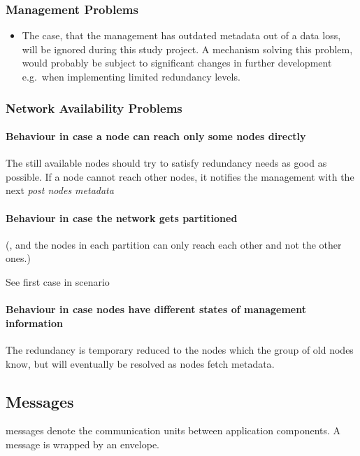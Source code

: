\subsubsection{Management Problems}\label{sec:scenario-management-problems}
\begin{itemize}
    \item The case, that the \gls{management} has outdated \gls{metadata} out of a data loss, will be ignored during this study project. A mechanism solving this problem, would probably be subject to significant changes in further development e.g.\ when implementing limited redundancy levels. %
\end{itemize}

\subsubsection{Network Availability Problems}\label{sec:scenario-network-errors}
\paragraph{Behaviour in case a node can reach only some nodes directly}
The still available \glspl{node} should try to satisfy redundancy needs as good as possible.
If a \gls{node} cannot reach other \glspl{node}, it notifies the \gls{management} with the next \emph{post nodes metadata}

\paragraph{Behaviour in case the network gets partitioned}
(, and the \glspl{node} in each partition can only reach each other and not the other ones.)

See first case in scenario~

\paragraph{Behaviour in case nodes have different states of management information}
The redundancy is temporary reduced to the \glspl{node} which the group of old \glspl{node} know, but will eventually be resolved as \glspl{node} fetch \gls{metadata}.


\subsection{Messages}\label{sec:messages}
\Glspl{message} denote the communication units between application components. A \gls{message} is wrapped by an \gls{envelope}.

